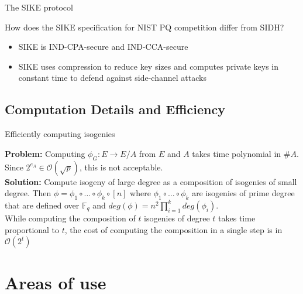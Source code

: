 \documentclass{beamer}
\begin{document}
\begin{frame}{The SIKE protocol}

How does the SIKE specification for NIST PQ competition differ from SIDH?

\begin{itemize}[\textbullet]
	\item SIKE is IND-CPA-secure and IND-CCA-secure %
	\item SIKE uses compression to reduce key sizes and computes private keys in constant time to defend against side-channel attacks
\end{itemize}

\end{frame}

\subsection{Computation Details and Efficiency}

\begin{frame}{Efficiently computing isogenies}


	\textbf{Problem:} Computing $\phi_G : E \to E/A$ from $E$ and $A$ takes time polynomial in $\#A$. Since $2^{e_A} \in \mathcal{O}(\sqrt{p})$, this is not acceptable.\\
	\vfill
	\textbf{Solution:} Compute isogeny of large degree as a composition of isogenies of small degree. Then $\phi = \phi_1 \circ \dots \circ \phi_k \circ [n]$ where $\phi_1 \circ \dots \circ \phi_k$ are isogenies of prime degree that are defined over $\mathbb{F}_q$ and $deg(\phi) = n^2 \prod^k_{i=1} deg(\phi_i)$.\\
	 While computing the composition of $t$ isogenies of degree $t$ takes time proportional to $t$, the cost of computing the composition in a single step is in $\mathcal{O}(2^t)$ 

\end{frame}

\section{Areas of use}
\end{document}
